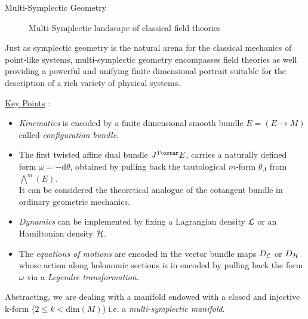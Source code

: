 \documentclass[final,20pt]{beamer}
\newlength{\onehalfcolwid}
\newlength{\threecolwid}
\begin{document}
\begin{frame}[t]
\begin{columns}[t]
\begin{column}{\threecolwid}
\begin{columns}[t,totalwidth=\threecolwid]
\begin{column}{\onehalfcolwid}
\begin{block}{Multi-Symplectic Geometry}
\begin{figure}
						\caption{Multi-Symplectic landscape of classical field theories}
					\end{figure}

						Just as symplectic geometry is the natural arena for the classical mechanics of point-like systems, 
						multi-symplectic geometry encompasses field theories as well providing
						a powerful and unifying finite dimensional portrait suitable for the description of a rich variety of physical systems. 
						
						\vspace{1.5cm}
						\PointingHand \: \underline{Key Points} :
						\begin{itemize}
							\item \emph{Kinematics} is encoded by a finite dimensional smooth bundle $E = \left( E\rightarrow M \right)$ 
								called \emph{configuration bundle}.
							\item The first twisted affine dual bundle $J^{1 \TwistedAffine}E$, 
								carries a naturally defined form $\omega = -\textrm{d} \theta$, 
								obtained by pulling back the tautological $m$-form $\theta_\Lambda$ from $\bigwedge^m (E)$.\\
								It can be considered the theoretical analogue of the cotangent bundle in ordinary geometric mechanics.
							\item \emph{Dynamics} can be implemented by fixing a Lagrangian density $\mathcal{L}$ 
										or an Hamiltonian density $\mathcal{H}$.
							\item The \emph{equations of motions} are encoded in the vector bundle maps $D_{\mathcal{L}}$ or  $D_{\mathcal{H}}$
									whose action along holonomic sections is in encoded by pulling back the form $\omega$ 
									via a \emph{Legendre transformation}.
						\end{itemize}
							Abstracting, we are dealing with a manifold endowed with a closed and injective k-form ($2 \leq k < \textrm{dim}(M)$) 
							i.e.  a \emph{multi-symplectic manifold}.	
						
						
						


				\end{block}
			\end{column} %


\end{columns}
\end{column}
\end{columns}
\end{frame}
\end{document}
